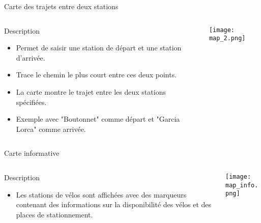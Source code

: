 \documentclass[10pt,svgnames,fragile]{beamer}
\begin{document}
\begin{frame}[label={sec:visualizationspath}]{Carte des trajets entre deux stations}
\begin{columns}
    \begin{column}{0.45\textwidth}
        \begin{block}{Description}
            \begin{itemize}
                \item Permet de saisir une station de départ et une station d’arrivée.
                \item Trace le chemin le plus court entre ces deux points.
                \item La carte montre le trajet entre les deux stations spécifiées.
                \item Exemple avec "Boutonnet" comme départ et "Garcia Lorca" comme arrivée.
            \end{itemize}
        \end{block}
    \end{column}

    \begin{column}{0.55\textwidth}
        \texttt{[image: map\_2.png]}  %
    \end{column}
\end{columns}

\end{frame}

\begin{frame}[label={sec:visualizationspath}]{Carte informative}
\begin{columns}
    \begin{column}{0.45\textwidth}
        \begin{block}{Description}
            \begin{itemize}
                \item Les stations de vélos sont affichées avec des marqueurs contenant
des informations sur la disponibilité des vélos et des places de stationnement.
            \end{itemize}
        \end{block}
    \end{column}

    \begin{column}{0.55\textwidth}
        \texttt{[image: map\_info.png]}  %
    \end{column}
\end{columns}

\end{frame}
\end{document}
